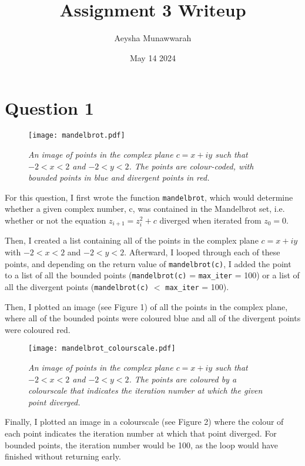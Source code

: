 \documentclass{article}
\title{Assignment 3 Writeup}
\author{Aeysha Munawwarah}
\date{May 14 2024}
\begin{document}
\maketitle

\section{Question 1}

\begin{figure}[h]
\caption{\textit{An image of points in the complex plane $c = x + iy$ such that 
$-2 < x < 2$ and $-2 < y < 2$. The points are colour-coded, with bounded points in blue and divergent points in red.}}
\centering
\texttt{[image: mandelbrot.pdf]}
\end{figure}

For this question, I first wrote the function \texttt{mandelbrot}, which would determine whether a given complex number, c, was contained in the Mandelbrot set, i.e. whether or not the equation $z_{i+1} = z_{i}^2 + c$ diverged when iterated from $z_{0} = 0$.

Then, I created a list containing all of the points in the complex plane $c = x + iy$ with $-2 < x < 2$ and $-2 < y < 2$. Afterward, I looped through each of these points, and depending on the return value of \texttt{mandelbrot(c)}, 
I added the point to a list of all the bounded points (\texttt{mandelbrot(c)} = \texttt{max\_iter} = 100) or a list of all the divergent points (\texttt{mandelbrot(c)} $<$ \texttt{max\_iter} = 100).

Then, I plotted an image (see Figure 1) of all the points in the complex plane, where all of the bounded points were coloured blue and all of the divergent points were coloured red.

\begin{figure}[h]
\caption{\textit{An image of points in the complex plane $c = x + iy$ such that 
$-2 < x < 2$ and $-2 < y < 2$. The points are coloured by a colourscale that indicates the iteration number at which the given point diverged.}}
\centering
\texttt{[image: mandelbrot\_colourscale.pdf]}
\end{figure}

Finally, I plotted an image in a colourscale (see Figure 2) where the colour of each point indicates the iteration number at which that point diverged. For bounded points, the iteration number would be 100, as the loop would have finished without returning early.
\end{document}
